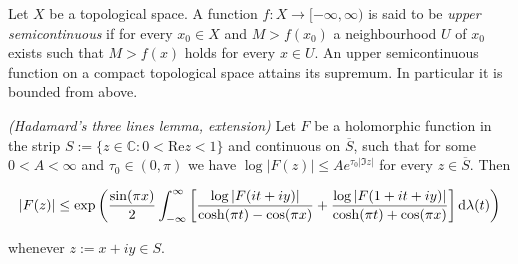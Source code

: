 Let $X$ be a topological space. A function $f: X \to [-\infty,\infty)$ is said to be \emph{upper semicontinuous} if for every $x_0 \in X$ and $M > f(x_0)$ a neighbourhood $U$ of $x_0$ exists such that $M > f(x)$ holds for every $x \in U$. An upper semicontinuous function on a compact topological space attains its supremum. In particular it is bounded from above.

\vspace{2mm}

\begin{mdframed}
	\begin{lemma}\emph{(Hadamard's three lines lemma, extension)}
		Let $F$ be a holomorphic function in the strip $S := \{z \in \mathbb{C}: 0 < \mathrm{Re}z < 1\}$ and continuous on $\overline{S}$, such that for some $0 < A < \infty$ and $\tau_0 \in (0,\pi)$ we have $\log \vert F(z)\vert \leq A e^{\tau_0 \vert \Im z \vert}$ for every $z \in \overline{S}$. Then

			\begin{equation*}
				\left| F(z) \right| \leq \exp\left( \frac{\sin(\pi x)}{2} \int_{-\infty}^\infty \left[ \frac{\log \vert F(it + iy)\vert}{\cosh(\pi t) - \cos(\pi x)} + \frac{\log \vert F(1 + it + iy)\vert}{\cosh(\pi t) + \cos(\pi x)} \right] \mathop{}\!\mathrm{d}\lambda(t)\right)
			\end{equation*}

			\noindent whenever $z := x + iy \in S$.
			\label{lem:EHTL}
	\end{lemma}
\end{mdframed}

